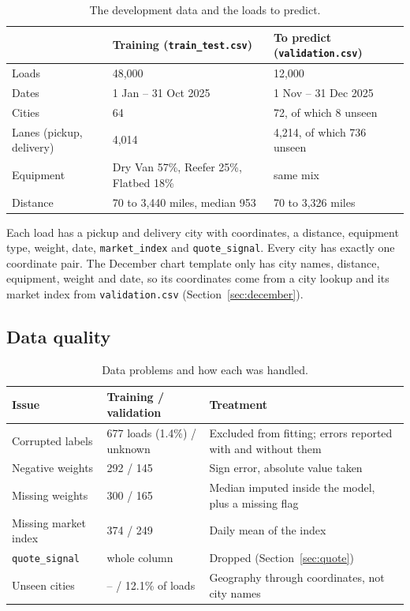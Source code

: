\documentclass[11pt]{article}
\newcommand{\code}[1]{\texttt{#1}}
\begin{document}
\begin{table}[h]
\centering\small
\begin{tabular}{lll}
\toprule
 & Training (\code{train\_test.csv}) & To predict (\code{validation.csv}) \\
\midrule
Loads & 48,000 & 12,000 \\
Dates & 1 Jan -- 31 Oct 2025 & 1 Nov -- 31 Dec 2025 \\
Cities & 64 & 72, of which 8 unseen \\
Lanes (pickup, delivery) & 4,014 & 4,214, of which 736 unseen \\
Equipment & Dry Van 57\%, Reefer 25\%, Flatbed 18\% & same mix \\
Distance & 70 to 3,440 miles, median 953 & 70 to 3,326 miles \\
\bottomrule
\end{tabular}
\caption{The development data and the loads to predict.}
\end{table}

Each load has a pickup and delivery city with coordinates, a distance, equipment type,
weight, date, \code{market\_index} and \code{quote\_signal}. Every city has exactly one
coordinate pair. The December chart template only has city names, distance, equipment,
weight and date, so its coordinates come from a city lookup and its market index from
\code{validation.csv} (Section~\ref{sec:december}).

\subsection{Data quality}

\begin{table}[h]
\centering\small
\begin{tabular}{p{3.7cm}p{3.3cm}p{7.9cm}}
\toprule
Issue & Training / validation & Treatment \\
\midrule
Corrupted labels & 677 loads (1.4\%) / unknown & Excluded from fitting; errors reported with and without them \\
Negative weights & 292 / 145 & Sign error, absolute value taken \\
Missing weights & 300 / 165 & Median imputed inside the model, plus a missing flag \\
Missing market index & 374 / 249 & Daily mean of the index \\
\code{quote\_signal} & whole column & Dropped (Section~\ref{sec:quote}) \\
Unseen cities & -- / 12.1\% of loads & Geography through coordinates, not city names \\
\bottomrule
\end{tabular}
\caption{Data problems and how each was handled.}
\end{table}
\end{document}
